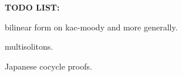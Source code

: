 \documentclass[etingof-lie.tex]{subfiles}
\begin{document}
\begin{noncompile}
\textbf{TODO LIST:}

bilinear form on kac-moody and more generally.

multisolitons.

Japanese cocycle proofs.
\end{noncompile}
\end{document}

